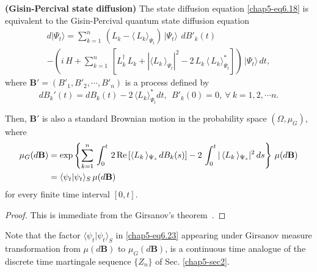 \begin{coro}
\textbf{(Gisin-Percival state diffusion)} The state diffusion equation \eqref{chap5-eq6.18} is equivalent to the  Gisin-Percival quantum state diffusion equation 
\begin{multline}
d\vert\Psi_t\rangle=\sum_{k=1}^n\, \left(L_k-\langle\, L_k\rangle_{\Psi_t}\right)\, \vert\Psi_t\rangle\, \  dB'_k(t)  \\ 
 - \left(i\, H + \sum_{k=1}^{n}\, \left[ L_k^\dag\, L_k+
\left|\langle L_k\, \rangle_{\Psi_t}\right|^2 -2\, L_k\, \langle\, L_k\rangle^*_{\Psi_t}\right]\right)\, \vert \Psi_t\rangle\, dt,  \label{chap5-eq6.21}
\end{multline}
where  $\mathbf{B}'=(B'_1, B'_2, \cdots , B'_n)$ is a process defined by     
\begin{equation}
dB_k'(t)=dB_k(t) - 2\, \langle L_k\rangle_{\Psi_t}^* dt,\ \ B'_k(0)=0,\ \forall\ k=1,2,\cdots n. \label{chap5-eq6.22}
\end{equation} 
\end{coro}
Then, $\mathbf{B}'$ is also a standard Brownian motion in the probability space $(\Omega, \mu_G)$, where 
{\fontsize{9pt}{11pt} \selectfont
\begin{align}
		\mu_G(d\mathbf{B})&={\rm exp}\left\{\sum_{k=1}^{n}\, \int_0^t\, 2\,{\rm Re}\left[\langle L_k\, \rangle_{\Psi_s}\, dB_k(s)\right] -2\, 
		\int_0^t \vert\,\langle L_k\, \rangle_{\Psi_s}\vert^2\, ds \right\}\, \mu(d\mathbf{B}) \nonumber \\
		&= \langle \psi_t\vert \psi_t\rangle_S\, \mu(d\mathbf{B})  \label{chap5-eq6.23}
\end{align}}
for every finite time interval $[0,t].$

\begin{proof}
This is immediate from the Girsanov's theorem~\cite{key43}. 
\end{proof}
\begin{remark}
Note that the factor $\langle \psi_t\vert \psi_t\rangle_S$ in \eqref{chap5-eq6.23} appearing under Girsanov measure transformation from $\mu(d\mathbf{B})$ to  $\mu_G(d\mathbf{B})$,  is a continuous time analogue of the discrete time martingale sequence $\{Z_n\}$ of Sec. \ref{chap5-sec2}.
\end{remark} 

